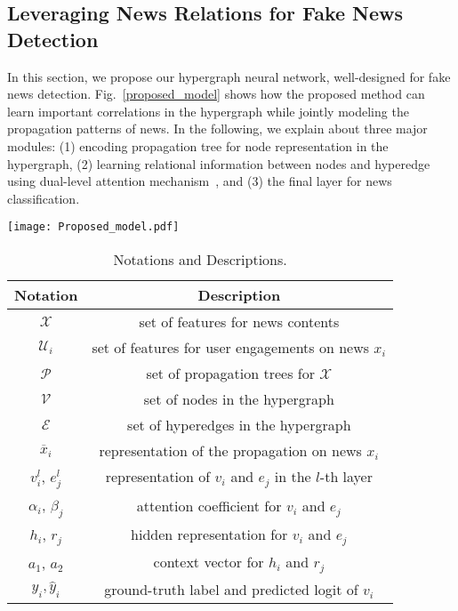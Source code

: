 \documentclass[conference]{IEEEtran}
\begin{document}
\subsection{Leveraging News Relations for Fake News Detection}
\label{hypergraph attention network}
In this section, we propose our hypergraph neural network, well-designed for fake news detection. Fig.~\ref{proposed_model} shows how the proposed method can learn important correlations in the hypergraph while jointly modeling the propagation patterns of news. In the following, we explain about three major modules: (1) encoding  propagation tree for node representation in the hypergraph, (2) learning relational information between nodes and hyperedge using dual-level attention mechanism~\cite{ding2020more}, and (3) the final layer for news classification.

\begin{figure*}
\centering
\texttt{[image: Proposed\_model.pdf]}
\caption{Illustration of the proposed framework, which jointly models propagation trees and the hypergraph for classifying unlabeled news. The figure shows an example of transdcutive node classification where the number of news is 5 and the number of hyperedge is 6. The color of node in the hypergraph represents the label of news. i.e., fake (red), true (blue), and unlabeled (gray). The figure is best shown in color.} 
\label{proposed_model}
\end{figure*}
\begin{table}
\centering
\caption{Notations and Descriptions.}
\label{notations}
\begin{tabular}{cc}
\hline
 \textbf{Notation} & \textbf{Description}   \\
\hline
\hline
$\mathcal{X}$ & set of features for news contents\\
$\mathcal{U}_i$ & set of features for user engagements on news $x_i$  \\
$\mathcal{P}$ & set of propagation trees for $\mathcal{X}$ \\
$\mathcal{V}$ & set of nodes in the hypergraph  \\
$\mathcal{E}$ & set of hyperedges in the hypergraph  \\
$\overline{x}_i$ & representation of the propagation on news $x_i$  \\
$v^l_i$, $e^l_j$ & representation of $v_i$ and $e_j$  in the $\textit{l}$-th layer  \\
$\alpha_{i}$, $\beta_{j}$ & attention coefficient for $v_i$ and  $e_j$ \\
$h_i$, $r_j$  & hidden representation for $v_i$ and $e_j$   \\
$a_1$, $a_2$ & context vector for $h_i$ and  $r_j$ \\
$y_i, \hat{y}_i$ & ground-truth label and predicted logit of $v_i$  \\
\hline
\end{tabular}
\end{table}
\end{document}
